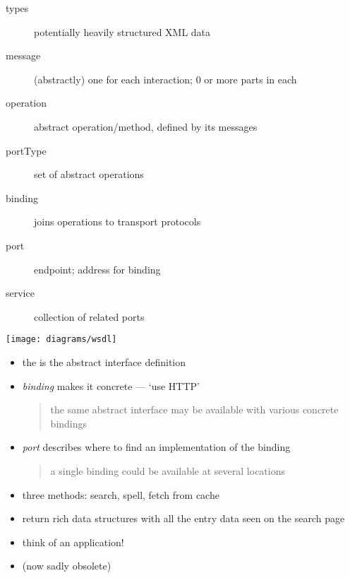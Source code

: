 \documentclass{sepslide-soa-faked} %
\begin{document}
\begin{slide}

	\begin{description}
	\item[types] potentially heavily structured XML data 
	\item[message] (abstractly) one for each interaction; 0 or more parts in each
	\item[operation] abstract operation/method, defined by its messages
	\item[portType] set of abstract operations 
\bigskip

	\item[binding] joins operations to transport protocols
	\item[port] endpoint; address for binding
	\item[service] collection of related ports
	\end{description}

\end{slide}

\begin{slide}
	\texttt{[image: diagrams/wsdl]}
\end{slide}

\begin{slide}
\begin{itemize}
\item the  is the abstract interface definition
\item \emph{binding} makes it concrete --- `use HTTP'
\begin{quote}
the same abstract interface may be available with various concrete bindings
\end{quote}
\item \emph{port} describes where to find an implementation of the binding
\begin{quote}
a single binding could be available at several locations
\end{quote}
	 \end{itemize}
\end{slide}

\begin{slide}

	\begin{itemize}	
	\item three methods: search, spell, fetch from cache
	\item return rich data structures with all the entry data 
		seen on the search page
	\item think of an application!
        \item (now sadly obsolete)
	\end{itemize}
\end{slide}
\end{document}
